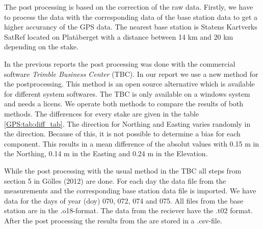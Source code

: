 
The post processing is based on the correction of the raw data.
Firstly, we have to process the data with the corresponding data of the base station data to get a higher accurancy of the GPS data.
The nearest base station is Statens Kartverks SatRef located on Platåberget with a distance between 14 km and 20 km depending on the stake.
\medskip

In the previous reports the post processing was done with the commercial software \textit{Trimble Business Center} (TBC). 
In our report we use a new method for the postprocessing. 
This method is an open source alternative which is available for different system softwares. 
The TBC is only available on a windows system and needs a licens. 
We operate both methods to compare the results of both methods.
The differences for every stake are given in the table \ref{GPS:tab:diff_tab}.
The direction for Northing and Easting varies randomly in the direction.
Because of this, it is not possible to determine a bias for each component.
This results in a mean difference of the absolut values with 0.15 m in the Northing, 0.14 m in the Easting and 0.24 m in the Elevation.
\medskip

While the post processing with the usual method in the TBC all steps from section 5 in Gölles (2012) are done.
For each day the data file from the measurements and the corresponding base station data file is imported. 
We have data for the days of year (doy) 070, 072, 074 and 075.
All files from the base station are in the .o18-format. 
The data from the reciever have the .t02 format. 
After the post processing the results from the are stored in a .csv-file.
\medskip

